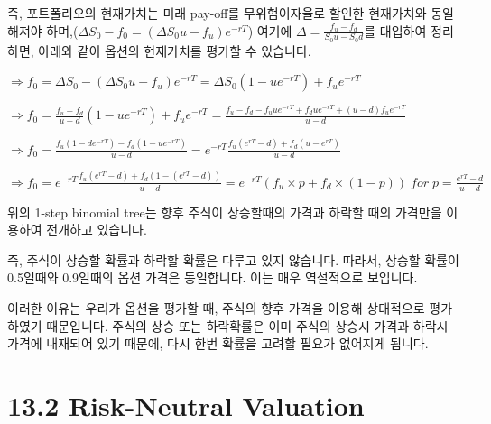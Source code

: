 \documentclass[
  letterpaper,
  DIV=11,
  numbers=noendperiod]{scrreprt}
\begin{document}
즉, 포트폴리오의 현재가치는 미래 pay-off를 무위험이자율로 할인한
현재가치와 동일해져야 하며,(\(\Delta S_0-f_0=(\Delta S_0u-f_u)e^{-rT}\))
여기에 \(\Delta=\frac{f_u-f_d}{S_0u-S_0d}\)를 대입하여 정리하면, 아래와
같이 옵션의 현재가치를 평가할 수 있습니다.

\(\Rightarrow f_0=\Delta S_0-(\Delta S_0u-f_u)e^{-rT}=\Delta S_0(1-ue^{-rT})+f_ue^{-rT}\)

\(\Rightarrow f_0=\frac{f_u-f_d}{u-d}(1-ue^{-rT})+f_ue^{-rT}=\frac{f_u-f_d-f_uue^{-rT}+f_due^{-rT}+(u-d)f_ue^{-rT}}{u-d}\)

\(\Rightarrow f_0=\frac{f_u(1-de^{-rT})-f_d(1-ue^{-rT})}{u-d}=e^{-rT}\frac{f_u(e^{rT}-d)+f_d(u-e^{rT})}{u-d}\)

\(\Rightarrow f_0=e^{-rT}\frac{f_u(e^{rT}-d)+f_d(1-(e^{rT}-d))}{u-d}=e^{-rT}(f_u\times p+f_d\times(1-p))\;for\;p=\frac{e^{rT}-d}{u-d}\)

\begin{tcolorbox}[enhanced jigsaw, toprule=.15mm, breakable, left=2mm, leftrule=.75mm, opacitybacktitle=0.6, coltitle=black, rightrule=.15mm, colback=white, titlerule=0mm, bottomtitle=1mm, colframe=quarto-callout-important-color-frame, title=\textcolor{quarto-callout-important-color}{\faExclamation}\hspace{0.5em}{Probability of stock price}, toptitle=1mm, arc=.35mm, colbacktitle=quarto-callout-important-color!10!white, opacityback=0, bottomrule=.15mm]

위의 1-step binomial tree는 향후 주식이 상승할때의 가격과 하락할 때의
가격만을 이용하여 전개하고 있습니다.

즉, 주식이 상승할 확률과 하락할 확률은 다루고 있지 않습니다. 따라서,
상승할 확률이 0.5일때와 0.9일때의 옵션 가격은 동일합니다. 이는 매우
역설적으로 보입니다.

이러한 이유는 우리가 옵션을 평가할 때, 주식의 향후 가격을 이용해
상대적으로 평가하였기 때문입니다. 주식의 상승 또는 하락확률은 이미
주식의 상승시 가격과 하락시 가격에 내재되어 있기 때문에, 다시 한번
확률을 고려할 필요가 없어지게 됩니다.

\end{tcolorbox}

\section*{13.2 Risk-Neutral Valuation}\label{risk-neutral-valuation}

\end{document}
